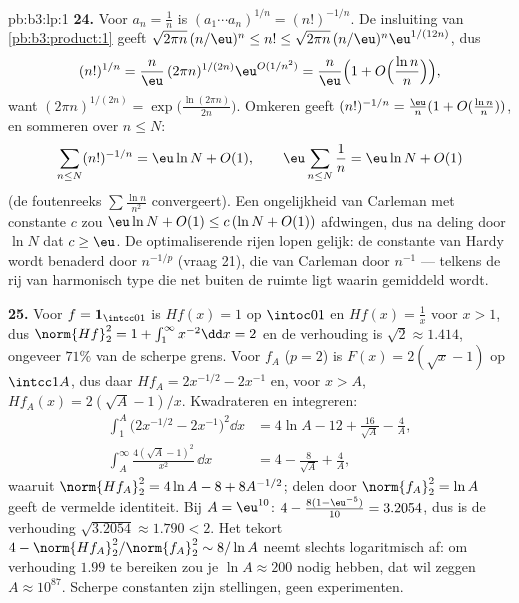 \begin{solution}{pb:b3:lp:1}
\textbf{24.} Voor $a_n = \frac1n$ is $(a_1\cdots a_n)^{1/n} =
(n!)^{-1/n}$. De insluiting van \cref{pb:b3:product:1} geeft
$\sqrt{2\pi n}\,(n/\eu)^n \leq n! \leq \sqrt{2\pi
n}\,(n/\eu)^n\eu^{1/(12n)}$, dus
\[
(n!)^{1/n} = \frac n\eu\,(2\pi n)^{1/(2n)}
\eu^{O(1/n^2)}
= \frac n\eu\Bigl(1 +
O\Bigl(\frac{\ln n}{n}\Bigr)\Bigr),
\]
want $(2\pi n)^{1/(2n)} = \exp\bigl(\frac{\ln(2\pi n)}{2n}\bigr)$.
Omkeren geeft $(n!)^{-1/n} = \frac\eu n(1 + O(\frac{\ln n}n))$,
en sommeren over $n \leq N$:
\[
\sum_{n\leq N}(n!)^{-1/n}
= \eu\ln N + O(1),
\qquad
\eu\sum_{n\leq N}\frac1n = \eu\ln N + O(1)
\]
(de foutenreeks $\sum\frac{\ln n}{n^2}$ convergeert). Een
ongelijkheid van Carleman met constante $c$ zou $\eu\ln N + O(1)
\leq c\,(\ln N + O(1))$ afdwingen, dus na deling door $\ln N$ dat
$c \geq \eu$. De optimaliserende rijen lopen gelijk: de constante
van Hardy wordt benaderd door $n^{-1/p}$ (vraag 21), die van
Carleman door $n^{-1}$ --- telkens de rij van harmonisch type die
net buiten de ruimte ligt waarin gemiddeld wordt.

\textbf{25.} Voor $f = \mathbf 1_{\intcc01}$ is $Hf(x) = 1$ op
$\intoc01$ en $Hf(x) = \frac1x$ voor $x > 1$, dus
$\norm{Hf}_2^2 = 1 + \int_1^\infty x^{-2}\dd x = 2$ en de
verhouding is $\sqrt2 \approx 1.414$, ongeveer $71\%$ van de
scherpe grens. Voor $f_A$ ($p = 2$) is $F(x) = 2(\sqrt x - 1)$ op
$\intcc1A$, dus daar $Hf_A = 2x^{-1/2} - 2x^{-1}$ en, voor $x >
A$, $Hf_A(x) = 2(\sqrt A - 1)/x$. Kwadrateren en integreren:
\begin{align*}
\int_1^A\bigl(2x^{-1/2} - 2x^{-1}\bigr)^2\dd x
&= 4\ln A - 12 + \frac{16}{\sqrt A} - \frac4A,\\
\int_A^{\infty}\frac{4(\sqrt A - 1)^2}{x^2}\,\dd x
&= 4 - \frac{8}{\sqrt A} + \frac4A,
\end{align*}
waaruit $\norm{Hf_A}_2^2 = 4\ln A - 8 + 8A^{-1/2}$; delen door
$\norm{f_A}_2^2 = \ln A$ geeft de vermelde identiteit. Bij $A =
\eu^{10}$: $4 - \frac{8(1 - \eu^{-5})}{10} = 3.2054$, dus is de
verhouding $\sqrt{3.2054} \approx 1.790 < 2$. Het tekort $4 -
\norm{Hf_A}_2^2/\norm{f_A}_2^2 \sim 8/\ln A$ neemt slechts
logaritmisch af: om verhouding $1.99$ te bereiken zou je $\ln A
\approx 200$ nodig hebben, dat wil zeggen $A \approx 10^{87}$.
Scherpe constanten zijn stellingen, geen experimenten.
\end{solution}
